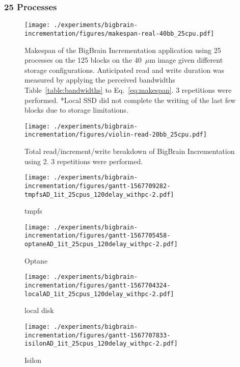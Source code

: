 \documentclass[conference]{IEEEtran}
\newcommand{\bigbrain}{BigBrain\xspace}
\begin{document}
\subsubsection{25 Processes}
\begin{figure}
    \texttt{[image: ./experiments/bigbrain-incrementation/figures/makespan-real-40bb\_25cpu.pdf]}
    \captionsetup{width=\columnwidth}
    \caption{Makespan of the \bigbrain Incrementation application using 25 
             processes on the 125 blocks on the 40~$\mu$m image given different
             storage configurations. Anticipated read and write duration was 
             measured by applying the perceived bandwidths Table~\ref{table:bandwidths}
             to Eq.~\ref{eq:makespan}. 3 
             repetitions were performed. *Local SSD did not complete the
    writing of the last few blocks due to storage limitations.}\label{fig:makespan-25cpus}
\end{figure}
\begin{figure}
    \texttt{[image: ./experiments/bigbrain-incrementation/figures/violin-read-20bb\_25cpu.pdf]}
    \captionsetup{width=\columnwidth}
    \caption{Total read/increment/write breakdown of \bigbrain Incrementation using 2. 3 repetitions were performed.}\label{fig:stacked-25cpus}
\end{figure}
\begin{figure*}
    \begin{subfigure}{\columnwidth}
        \centering
    \texttt{[image: ./experiments/bigbrain-incrementation/figures/gantt-1567709282-tmpfsAD\_1it\_25cpus\_120delay\_withpc-2.pdf]}
    \caption{tmpfs}
\end{subfigure}
\begin{subfigure}{\columnwidth}
        \centering
    \texttt{[image: ./experiments/bigbrain-incrementation/figures/gantt-1567705458-optaneAD\_1it\_25cpus\_120delay\_withpc-2.pdf]}
    \caption{Optane}
\end{subfigure}
\begin{subfigure}{\columnwidth}
        \centering
    \texttt{[image: ./experiments/bigbrain-incrementation/figures/gantt-1567704324-localAD\_1it\_25cpus\_120delay\_withpc-2.pdf]}
    \caption{local disk}
\end{subfigure}
\begin{subfigure}{\columnwidth}
        \centering
    \texttt{[image: ./experiments/bigbrain-incrementation/figures/gantt-1567707833-isilonAD\_1it\_25cpus\_120delay\_withpc-2.pdf]}
    \caption{Isilon}\label{fig:gantt25isilon}
\end{subfigure}
\caption{Gantt charts for each storage device (App Direct Mode) processing 125 blocks of the 40$\mu$m BigBrain using 25 processes and a sleep delay of 120s}\label{fig:gantt25}
\end{figure*}
\end{document}
